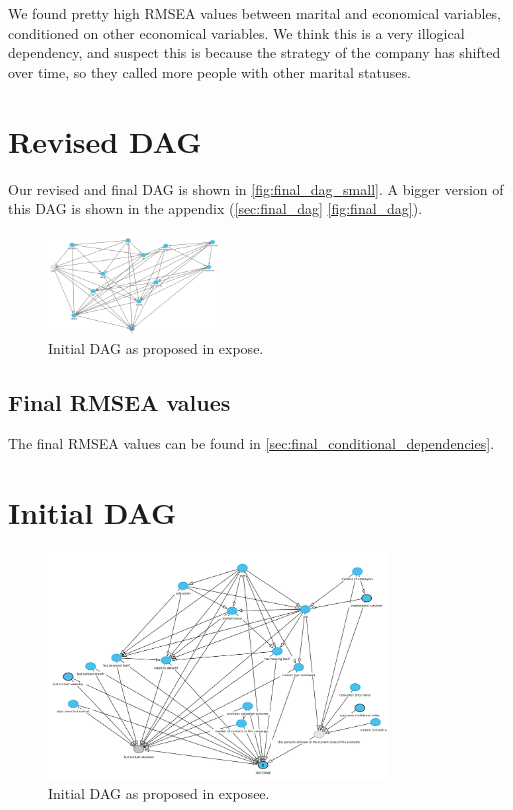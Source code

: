 \documentclass[11pt]{article}
\begin{document}
\begin{multicols}{2}
We found pretty high RMSEA values between marital and economical variables,
conditioned on other economical variables. We think this is a very illogical
dependency, and suspect this is because the strategy of the company has shifted
over time, so they called more people with other marital statuses. 

\section{Revised DAG}
Our revised and final DAG is shown in \autoref{fig:final_dag_small}.  A bigger
version of this DAG is shown in the appendix (\autoref{sec:final_dag}
\autoref{fig:final_dag}). 

\begin{figure}[H]
	\centering
	\includegraphics[width=0.4\textwidth]{images/final_dag}
	\caption{Initial DAG as proposed in expose.}
	\label{fig:final_dag_small}
\end{figure}

\subsection{Final RMSEA values}
The final RMSEA values can be found in \ref{sec:final_conditional_dependencies}. 

\newpage
\end{multicols}
\appendix
\section{Initial DAG}
\label{sec:initial_dag}
\begin{figure}[h]
	\centering
	\includegraphics[width=0.8\textwidth]{images/initial_dag}
	\caption{Initial DAG as proposed in exposee.}
	\label{fig:initial_dag}
\end{figure}
\end{document}
